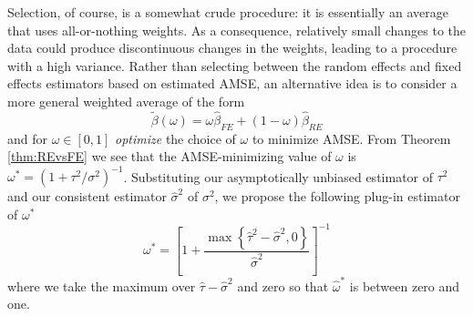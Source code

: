 Selection, of course, is a somewhat crude procedure: it is essentially an average that uses all-or-nothing weights.
As a consequence, relatively small changes to the data could produce discontinuous changes in the weights, leading to a procedure with a high variance.
Rather than selecting between the random effects and fixed effects estimators based on estimated AMSE, an alternative idea is to consider a more general weighted average of the form
\[\widetilde{\beta}(\omega) =  \omega \widehat{\beta}_{FE} + (1 - \omega)\widehat{\beta}_{RE}\]
and for $\omega \in [0,1]$ \emph{optimize} the choice of $\omega$ to minimize AMSE. 
From Theorem \ref{thm:REvsFE} we see that the AMSE-minimizing value of $\omega$ is $\omega^* = (1 + \tau^2/\sigma^2)^{-1}$.
Substituting our asymptotically unbiased estimator of $\tau^2$ and our consistent estimator $\widehat{\sigma}^2$ of $\sigma^2$, we propose the following plug-in estimator of $\omega^*$ 
\begin{equation*}
  \omega^* = \left[ 1 + \frac{ \max\left\{  \widehat{\tau}^2 - \widehat{\sigma}^2, 0\right\}}{\widehat{\sigma}^2} \right]^{-1}
\end{equation*}
where we take the maximum over $\widehat{\tau} - \widehat{\sigma}^2$ and zero so that $\widehat{\omega}^*$ is between zero and one. 
